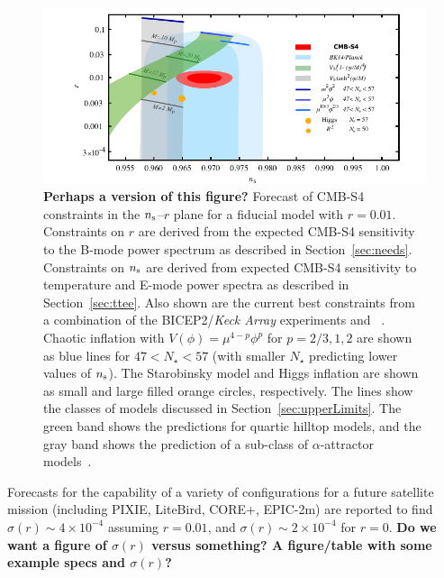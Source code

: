 \begin{figure}[ht]
\begin{center}
\includegraphics[width=6in]{figs/nsrlabeledrp01v10s}
\end{center}
\caption{{\bf Perhaps a version of this figure?} Forecast of CMB-S4 constraints in the $n_{\rm s}$--$r$ plane for a fiducial model with $r=0.01$. Constraints 
on $r$ are derived from the expected CMB-S4 sensitivity to the B-mode power spectrum as described in 
Section~\ref{sec:needs}. Constraints on $n_{\rm s}$ are derived from expected CMB-S4 sensitivity to temperature and 
E-mode power spectra as described in Section~\ref{sec:ttee}. Also shown are the current best constraints from a combination of the { BICEP}2/{\em Keck Array} experiments and \planck\ \cite{Array:2015xqh}. Chaotic inflation with $V(\phi)=\mu^{4-p}\phi^p$ for \mbox{$p=2/3,1,2$} are shown as blue lines for $47<N_\star<57$ (with smaller $N_\star$ predicting lower values of $n_{\rm s}$). The Starobinsky model and Higgs inflation are shown as small and large filled orange circles, respectively. The lines show the classes of models discussed in Section~\ref{sec:upperLimits}. The green band shows the predictions for quartic hilltop models, and the gray band shows the prediction of a sub-class of $\alpha$-attractor models~\cite{Kallosh:2013hoa}.
}
\label{fig:nsrp01}
\end{figure}

Forecasts for the capability of a variety of configurations for a future satellite mission (including PIXIE, LiteBird, CORE+, EPIC-2m) are reported to find $\sigma(r)\sim4 \times 10^{-4}$ assuming $r=0.01$, and $\sigma(r)\sim2\times 10^{-4}$ for $r=0$. {\bf Do we want a figure of $\sigma(r)$ versus something? A figure/table with some example specs and $\sigma(r)$?}

